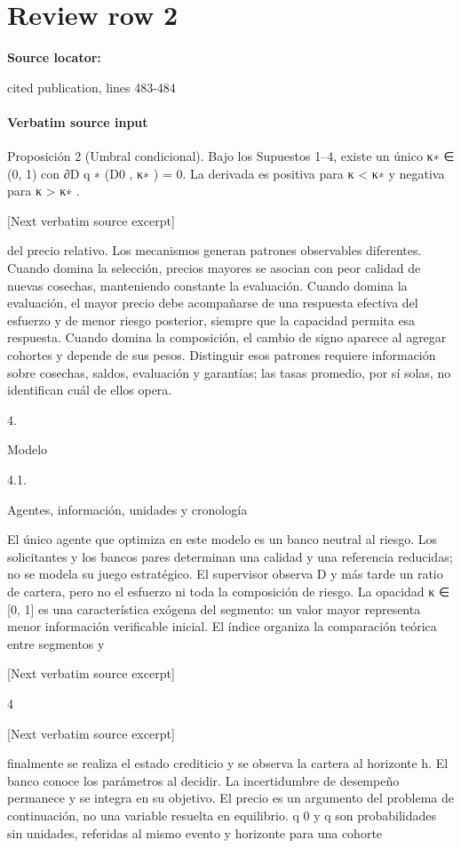 \documentclass[10pt]{article}
\begin{document}
\section*{Review row 2}
\textbf{Source locator:} {\footnotesize\raggedright cited publication, lines 483-\allowbreak{}484\par}
\paragraph{Verbatim source input}
\begin{ReviewVerbatim}
Proposición 2 (Umbral condicional). Bajo los Supuestos 1–4, existe un único κ∗ ∈ (0, 1) con
∂D q ∗ (D0 , κ∗ ) = 0. La derivada es positiva para κ < κ∗ y negativa para κ > κ∗ .

[Next verbatim source excerpt]

del precio relativo.
Los mecanismos generan patrones observables diferentes. Cuando domina la selección, precios
mayores se asocian con peor calidad de nuevas cosechas, manteniendo constante la evaluación.
Cuando domina la evaluación, el mayor precio debe acompañarse de una respuesta efectiva del
esfuerzo y de menor riesgo posterior, siempre que la capacidad permita esa respuesta. Cuando
domina la composición, el cambio de signo aparece al agregar cohortes y depende de sus pesos.
Distinguir esos patrones requiere información sobre cosechas, saldos, evaluación y garantías; las
tasas promedio, por sí solas, no identiﬁcan cuál de ellos opera.

4.

Modelo

4.1.

Agentes, información, unidades y cronología

El único agente que optimiza en este modelo es un banco neutral al riesgo. Los solicitantes y los
bancos pares determinan una calidad y una referencia reducidas; no se modela su juego estratégico.
El supervisor observa D y más tarde un ratio de cartera, pero no el esfuerzo ni toda la composición de
riesgo. La opacidad κ ∈ [0, 1] es una característica exógena del segmento: un valor mayor representa
menor información veriﬁcable inicial. El índice organiza la comparación teórica entre segmentos y

[Next verbatim source excerpt]


4

[Next verbatim source excerpt]

ﬁnalmente se realiza el estado crediticio y se observa la cartera al horizonte h. El banco conoce los
parámetros al decidir. La incertidumbre de desempeño permanece y se integra en su objetivo. El
precio es un argumento del problema de continuación, no una variable resuelta en equilibrio.
q 0 y q son probabilidades sin unidades, referidas al mismo evento y horizonte para una cohorte


\end{ReviewVerbatim}
\end{document}
